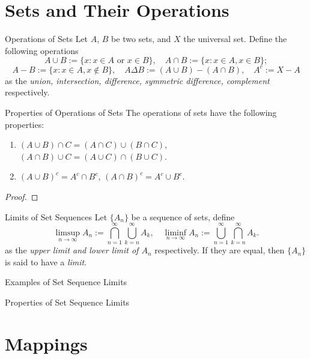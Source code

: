 
\section{Sets and Their Operations}

\begin{definition}{Operations of Sets}{}
  Let $A$, $B$ be two sets,
  and $X$ the universal set.
  Define the following operations
  \begin{equation}
    A \cup B := \{x: x \in A \text{ or } x \in B\}, \quad
    A \cap B := \{x: x \in A, x \in B\};
  \end{equation}
  \begin{equation}
    A - B := \{x: x \in A, x \not\in B\}, \quad
    A \Delta B := (A \cup B) - (A \cap B), \quad
    A^c := X - A
  \end{equation}
  as the \emph{union, intersection, difference, symmetric difference, complement} respectively.
\end{definition}

\begin{proposition}{Properties of Operations of Sets}{}
  The operations of sets have the following properties:
  \begin{enumerate}
  \item $(A \cup B)\cap C = (A \cap C) \cup (B \cap C)$,
    $(A \cap B) \cup C = (A \cup C) \cap (B \cup C)$.
  \item $(A\cup B)^c = A^c \cap B^c$, $(A \cap B)^c = A^c \cup B^c$.
  \end{enumerate}
\end{proposition}

\begin{proof}
  
\end{proof}

\begin{definition}{Limits of Set Sequences}{}
  Let $\{A_n\}$ be a sequence of sets,
  define
  \begin{equation}
    \limsup \limits_{n \rightarrow \infty} A_n := \bigcap \limits_{n = 1}^{\infty}
    \bigcup \limits_{k = n} ^{\infty} A_k, \quad
    \liminf \limits_{n \rightarrow \infty} A_n := \bigcup \limits_{n = 1}^{\infty}
    \bigcap \limits_{k = n}^{\infty}A_k.
  \end{equation}
  as the \emph{upper limit and lower limit of $A_n$} respectively.
  If they are equal, then $\{A_n\}$ is said to have a \emph{limit}.
\end{definition}

\begin{example}{Examples of Set Sequence Limits}{}
  
\end{example}

\begin{proposition}{Properties of Set Sequence Limits}{}
  
\end{proposition}


\section{Mappings}











